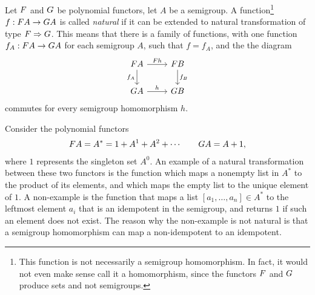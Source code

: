 \begin{definition}\label{def:natural-functions}
    Let $\functor$  and $\functorg$ be polynomial functors, let $A$ be a semigroup. A function\footnote{This function is not necessarily a semigroup homomorphism. In fact, it would not even make sense call it a homomorphism, since the functors $\functor$ and $\functorg$ produce sets and not semigroups.}  $f : \functor A \to \functorg A$ is called \emph{natural} if it can be extended to natural transformation of type $\functor \Rightarrow \functorg$. This means that there is a family of functions, with one function
    $
    f_A : \functor A \to \functorg A
    $
    for each semigroup $A$, such  that $f=f_A$, and the the  diagram
    \[
    \begin{tikzcd}
    \functor A 
    \ar[r,"\functor h"]
    \ar[d,"f_A"']
    & 
    \functor B 
    \ar[d,"f_B"]
    \\
    \functorg A 
    \ar[r,"h"]
    &
    \functorg B
    \end{tikzcd}
    \]
    commutes for every semigroup homomorphism $h$.
\end{definition}


\begin{example}
    Consider the polynomial functors 
    \begin{align*}
    \functor A = A^* = 1 + A^1 + A^2 + \cdots  \qquad \functorg A = A + 1,     \end{align*} 
    where $1$ represents the singleton set $A^0$.
An example of a natural transformation between these two functors is the function which maps a nonempty list in $A^*$ to the product of its elements, and which maps the empty list to the unique element of $1$. A non-example is the function that maps a list $[a_1,\ldots,a_n] \in A^*$ to the leftmost element $a_i$ that is an idempotent in the semigroup, and returns $1$ if such an element does not exist. The reason why the non-example is not natural is that a semigroup homomorphism can map a non-idempotent to an idempotent.
\end{example}


